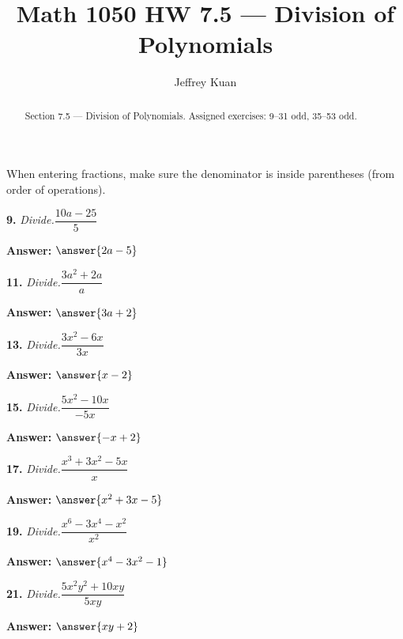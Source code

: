 \documentclass{ximera}
\author{Jeffrey Kuan}
\title{Math 1050 HW 7.5 --- Division of Polynomials}
\begin{document}
\begin{abstract}
    Section 7.5 --- Division of Polynomials.
    Assigned exercises: 9–31 odd, 35–53 odd.
\end{abstract}

\maketitle

When entering fractions, make sure the denominator is inside parentheses (from order of operations).

\begin{problem}
\textbf{9.} \emph{Divide.}\quad $\dfrac{10a - 25}{5}$

\textbf{Answer:} $\answer{2a -5}$
\end{problem}

\begin{problem}
\textbf{11.} \emph{Divide.}\quad $\dfrac{3a^2 + 2a}{a}$

\textbf{Answer:} $\answer{3a +2}$
\end{problem}

\begin{problem}
\textbf{13.} \emph{Divide.}\quad $\dfrac{3x^2 - 6x}{3x}$

\textbf{Answer:} $\answer{x -2}$
\end{problem}

\begin{problem}
\textbf{15.} \emph{Divide.}\quad $\dfrac{5x^2 - 10x}{-5x}$

\textbf{Answer:} $\answer{-x +2}$
\end{problem}

\begin{problem}
\textbf{17.} \emph{Divide.}\quad $\dfrac{x^3 + 3x^2 - 5x}{x}$

\textbf{Answer:} $\answer{x^2 +3x -5}$
\end{problem}

\begin{problem}
\textbf{19.} \emph{Divide.}\quad $\dfrac{x^6 - 3x^4 - x^2}{x^2}$

\textbf{Answer:} $\answer{x^4 -3x^2 -1}$
\end{problem}

\begin{problem}
\textbf{21.} \emph{Divide.}\quad $\dfrac{5x^2y^2 + 10xy}{5xy}$

\textbf{Answer:} $\answer{xy +2}$
\end{problem}
\end{document}
